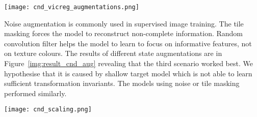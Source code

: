 \documentclass[a4paper,11pt]{elsarticle}
\begin{document}
\begin{figure*}[t!]
\centering
\texttt{[image: cnd\_vicreg\_augmentations.png]}
\caption{Agent performance for different state augmentations, evaluated in terms of the overall score, external reward obtained and the number of rooms explored.}
\label{img:result_cnd_aug}
\end{figure*}

Noise augmentation is commonly used in supervised image training. The tile masking
forces the model to reconstruct non-complete information. Random convolution filter
helps the model to learn to focus on informative features, not on texture colours. The results of different state augmentations are in Figure~\ref{img:result_cnd_aug} revealing that the third scenario worked best. We hypothesise that it is caused by shallow target model which is not able to learn sufficient transformation invariants. The models using noise or tile masking performed similarly.

\begin{figure*}[t!]
\centering
\texttt{[image: cnd\_scaling.png]}
\caption{Agent's performance for different intrinsic reward scaling methods, evaluated in terms of the overall score, external reward obtained and the number of rooms explored.}
\label{img:result_cnd_scaling}
\end{figure*}
\end{document}
